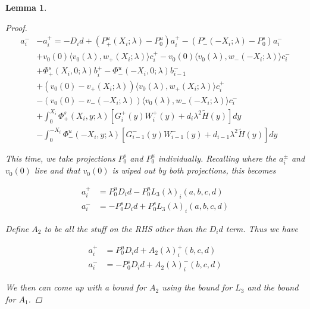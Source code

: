 \documentclass[12pt]{article}
\newtheorem{lemma}{Lemma}
\begin{document}
\begin{lemma}
\begin{proof}
\begin{align*}
a_i^- &- a_i^+ = -D_i d + (P^u_+(X_i; \lambda) - P_0^u)a_i^+ - (P^s_-(-X_i; \lambda) - P_0^s)a_i^- \\
&+ v_0(0) \langle v_0(\lambda), w_+(X_i; \lambda) \rangle c_i^+ 
- v_0(0) \langle v_0(\lambda), w_-(-X_i; \lambda) \rangle c_i^- \\
&+ \Phi^s_+(X_i, 0; \lambda)b_i^+ - \Phi^u_-(-X_i, 0; \lambda)b_{i-1}^- \\
&+ (v_0(0) - v_+(X_i; \lambda)) \langle v_0(\lambda), w_+(X_i; \lambda) \rangle c_i^+ \\
&- (v_0(0) - v_-(-X_i; \lambda)) \langle v_0(\lambda), w_-(-X_i; \lambda) \rangle c_i^- \\
&+ \int_0^{X_i} \Phi^s_+(X_i, y; \lambda) [ G_i^+(y) W_i^+(y) + d_i \lambda^2 \tilde{H}(y) ] dy \\
&- \int_0^{-X_i} \Phi^u_-(-X_i, y; \lambda) [ G_{i-1}^-(y) W_{i-1}^-(y) + d_{i-1} \lambda^2 \tilde{H}(y) ] dy 
\end{align*}

This time, we take projections $P^s_0$ and $P^u_0$ individually. Recalling where the $a_i^\pm$ and $v_0(0)$ live and that $v_0(0)$ is wiped out by both projections, this becomes 

\begin{align*}
a_i^+ &= P^u_0 D_i d - P^u_0 L_3(\lambda)_i(a, b, c, d) \\
a_i^- &= -P^s_0 D_i d + P^s_0 L_3(\lambda)_i(a, b, c, d)
\end{align*}

Define $A_2$ to be all the stuff on the RHS other than the $D_i d$ term. Thus we have 

\begin{align*}
a_i^+ &= P^u_0 D_i d + A_2(\lambda)_i^+(b, c, d) \\
a_i^- &= -P^s_0 D_i d + A_2(\lambda)_i^-(b, c, d)
\end{align*}

We then can come up with a bound for $A_2$ using the bound for $L_3$ and the bound for $A_1$.


\end{proof}
\end{lemma}
\end{document}
